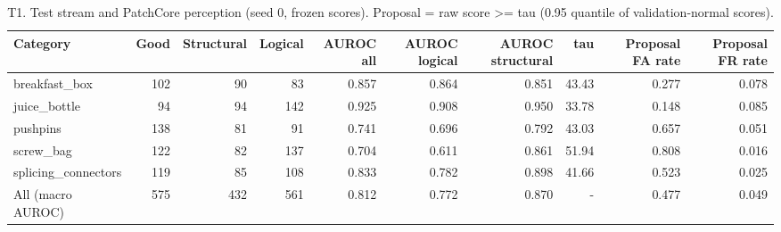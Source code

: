 \begin{table}[t]\centering\small
\caption{T1. Test stream and PatchCore perception (seed 0, frozen scores). Proposal = raw score >= tau (0.95 quantile of validation-normal scores).}
\label{tab:T1_dataset_perception}
\begin{tabular}{lrrrrrrrrr}\hline
Category & Good & Structural & Logical & AUROC all & AUROC logical & AUROC structural & tau & Proposal FA rate & Proposal FR rate \\ \hline
breakfast\_box & 102 & 90 & 83 & 0.857 & 0.864 & 0.851 & 43.43 & 0.277 & 0.078 \\
juice\_bottle & 94 & 94 & 142 & 0.925 & 0.908 & 0.950 & 33.78 & 0.148 & 0.085 \\
pushpins & 138 & 81 & 91 & 0.741 & 0.696 & 0.792 & 43.03 & 0.657 & 0.051 \\
screw\_bag & 122 & 82 & 137 & 0.704 & 0.611 & 0.861 & 51.94 & 0.808 & 0.016 \\
splicing\_connectors & 119 & 85 & 108 & 0.833 & 0.782 & 0.898 & 41.66 & 0.523 & 0.025 \\
All (macro AUROC) & 575 & 432 & 561 & 0.812 & 0.772 & 0.870 & - & 0.477 & 0.049 \\
\hline\end{tabular}
\end{table}
